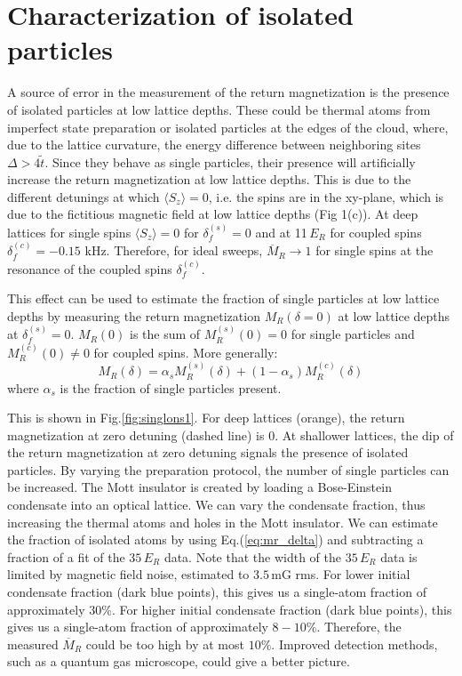 \documentclass[12pt]{iopart}
\begin{document}
\section{Characterization of isolated particles}\label{appF}
A source of error in the measurement of the return magnetization is the presence of isolated particles at low lattice depths. These could be thermal atoms from imperfect state preparation or isolated particles at the edges of the cloud, where, due to the lattice curvature, the energy difference between neighboring sites $\Delta > 4 \tilde{t}$. Since they behave as single particles, their presence will artificially increase the return magnetization at low lattice depths. This is due to the different detunings at which $\langle S_z \rangle = 0$, i.e. the spins are in the xy-plane, which is due to the fictitious magnetic field at low lattice depths (Fig 1(c)). At deep lattices for single spins $\langle S_z \rangle = 0$ for $\delta^{(s)}_f = 0$ and at 11$\,E_R$ for coupled spins $\delta^{(c)}_f = -0.15$ kHz. Therefore, for ideal sweeps, $\overline{M}_R \rightarrow 1$ for single spins at the resonance of the coupled spins $\delta^{(c)}_f$. 

This effect can be used to estimate the fraction of single particles at low lattice depths by measuring the return magnetization $M_{R}(\delta = 0)$ at low lattice depths at $\delta^{(s)}_f = 0$. $M_{R}(0)$ is the sum of $M^{(s)}_{R}(0) = 0$ for single particles and $M^{(c)}_{R}(0) \neq 0$ for coupled spins. More generally:
\begin{equation}
 M_{R}(\delta) = \alpha_s M^{(s)}_{R}(\delta) + (1-\alpha_s) M^{(c)}_{R}(\delta)  
 \label{eq:mr_delta}
\end{equation}
where $\alpha_s$ is the fraction of single particles present. 

This is shown in Fig.\ref{fig:singlons1}. For deep lattices (orange), the return magnetization at zero detuning (dashed line) is 0. At shallower lattices, the dip of the return magnetization at zero detuning signals the presence of isolated particles. By varying the preparation protocol, the number of single particles can be increased. The Mott insulator is created by loading a Bose-Einstein condensate into an optical lattice. We can vary the condensate fraction, thus increasing the thermal atoms and holes in the Mott insulator. We can estimate the fraction of isolated atoms by using Eq.(\ref{eq:mr_delta}) and subtracting a fraction of a fit of the $35\,E_R$ data. Note that the width of the $35\,E_R$ data is limited by magnetic field noise, estimated to $3.5\,$mG rms. For lower initial condensate fraction (dark blue points), this gives us a single-atom fraction of approximately $30\%$. For higher initial condensate fraction (dark blue points), this gives us a single-atom fraction of approximately $8-10\%$. Therefore, the measured $\overline{M}_R$ could be too high by at most $10\%$. Improved detection methods, such as a quantum gas microscope, could give a better picture. 
\end{document}
